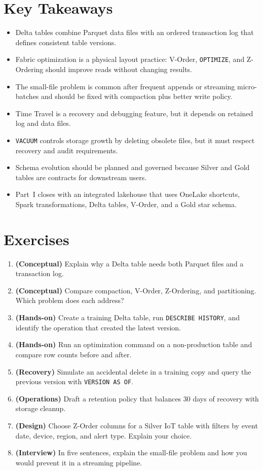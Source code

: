 \section*{Key Takeaways}
\begin{itemize}
    \item Delta tables combine Parquet data files with an ordered transaction log that defines consistent table versions.
    \item Fabric optimization is a physical layout practice: V-Order, \texttt{OPTIMIZE}, and Z-Ordering should improve reads without changing results.
    \item The small-file problem is common after frequent appends or streaming micro-batches and should be fixed with compaction plus better write policy.
    \item Time Travel is a recovery and debugging feature, but it depends on retained log and data files.
    \item \texttt{VACUUM} controls storage growth by deleting obsolete files, but it must respect recovery and audit requirements.
    \item Schema evolution should be planned and governed because Silver and Gold tables are contracts for downstream users.
    \item Part~I closes with an integrated lakehouse that uses OneLake shortcuts, Spark transformations, Delta tables, V-Order, and a Gold star schema.
\end{itemize}

\section{Exercises}
\begin{enumerate}
    \item \textbf{(Conceptual)} Explain why a Delta table needs both Parquet files and a transaction log.
    \item \textbf{(Conceptual)} Compare compaction, V-Order, Z-Ordering, and partitioning. Which problem does each address?
    \item \textbf{(Hands-on)} Create a training Delta table, run \texttt{DESCRIBE HISTORY}, and identify the operation that created the latest version.
    \item \textbf{(Hands-on)} Run an optimization command on a non-production table and compare row counts before and after.
    \item \textbf{(Recovery)} Simulate an accidental delete in a training copy and query the previous version with \texttt{VERSION AS OF}.
    \item \textbf{(Operations)} Draft a retention policy that balances 30 days of recovery with storage cleanup.
    \item \textbf{(Design)} Choose Z-Order columns for a Silver IoT table with filters by event date, device, region, and alert type. Explain your choice.
    \item \textbf{(Interview)} In five sentences, explain the small-file problem and how you would prevent it in a streaming pipeline.
\end{enumerate}

